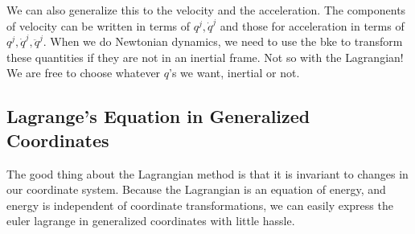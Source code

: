 We can also generalize this to the velocity and the acceleration. The components of velocity can be written in terms of $q^j, \dot{q}^j$ and those for acceleration in terms of $q^j, \dot{q}^j, \ddot{q}^j$.  When we do Newtonian dynamics, we need to use the \gls{bke} to transform these quantities if they are not in an \gls{inertial frame}. Not so with the \gls{Lagrangian}! We are free to choose whatever $q$'s we want, inertial or not.

\subsection{Lagrange's Equation in Generalized Coordinates}

The good thing about the \gls{Lagrangian} method is that it is invariant to changes in our coordinate system. Because the \gls{Lagrangian} is an equation of energy, and energy is independent of coordinate transformations, we can easily express the \gls{euler lagrange} in generalized coordinates with little hassle. 

